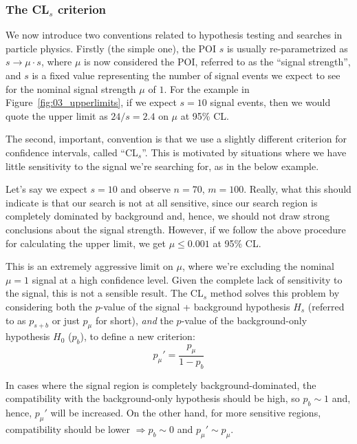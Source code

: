 \subsubsection{The \texorpdfstring{CL$_s$}{CLs} criterion}
\label{sec:03_cls}

We now introduce two conventions related to hypothesis testing and searches in particle physics. 
Firstly (the simple one), the POI $s$ is usually re-parametrized as $s \rightarrow \mu \cdot s$,
where $\mu$ is now considered the POI, referred to as the ``signal strength'', and $s$ is a fixed value representing the number of signal events we expect to see for the nominal signal strength $\mu$ of $1$. 
For the example in Figure~\ref{fig:03_upperlimits}, if we expect $s = 10$ signal events, then we would quote the upper limit as $24 / s = 2.4$ on $\mu$ at 95\% CL.

The second, important, convention is that we use a slightly different criterion for confidence intervals, called ``CL$_s$''. 
This is motivated by situations where we have little sensitivity to the signal we're searching for, as in the below example.

\begin{example}
\label{ex:03_cls}
Let's say we expect $s = 10$ and observe $n = 70$, $m = 100$. 
Really, what this should indicate is that our search is not at all sensitive, since our search region is completely dominated by background and, hence, we should not draw strong conclusions about the signal strength. 
However, if we follow the above procedure for calculating the upper limit, we get $\mu \leq 0.001$ at 95\% CL.
\end{example}

This is an extremely aggressive limit on $\mu$, where we're excluding the nominal $\mu = 1$ signal at a high confidence level.
Given the complete lack of sensitivity to the signal, this is not a sensible result.
The CL$_s$ method solves this problem by considering both the $p$-value of the signal + background hypothesis $H_s$ (referred to as $p_{s+b}$ or just $p_\mu$ for short), \textit{and} the $p$-value of the background-only hypothesis $H_0$ ($p_b$), to define a new criterion:
\begin{equation}
p_\mu' = \frac{p_\mu}{1 - p_b}
\label{eq:03_pmu_prime}
\end{equation}

In cases where the signal region is completely background-dominated, the compatibility with the background-only hypothesis should be high, so $p_b \sim 1$ and, hence, $p_\mu'$ will be increased. 
On the other hand, for more sensitive regions, compatibility should be lower $\Rightarrow p_b \sim 0$ and $p_\mu' \sim p_\mu$.

